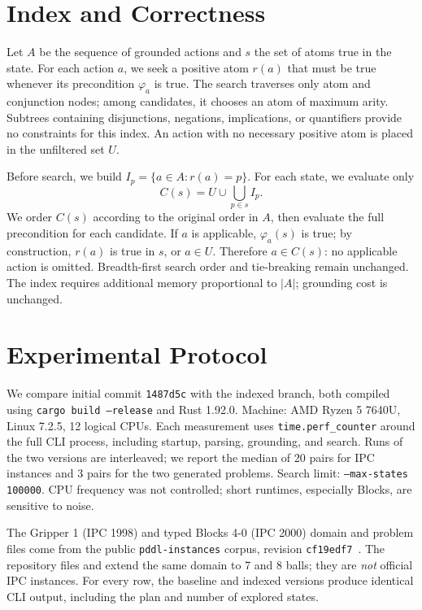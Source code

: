 \documentclass[10pt,a4paper]{article}
\begin{document}
\section{Index and Correctness}
Let $A$ be the sequence of grounded actions and $s$ the set of atoms
true in the state. For each action $a$, we seek a positive atom $r(a)$
that must be true whenever its precondition $\varphi_a$ is true. The
search traverses only atom and conjunction nodes; among candidates, it
chooses an atom of maximum arity. Subtrees containing disjunctions,
negations, implications, or quantifiers provide no constraints for this
index. An action with no necessary positive atom is placed in the
unfiltered set $U$.

Before search, we build $I_p=\{a\in A:r(a)=p\}$.
For each state, we evaluate only
\begin{equation}
 C(s)=U\cup\bigcup_{p\in s} I_p.
\end{equation}
We order $C(s)$ according to the original order in $A$, then evaluate
the full precondition for each candidate. If $a$ is applicable,
$\varphi_a(s)$ is true; by construction, $r(a)$ is true in $s$, or
$a\in U$. Therefore $a\in C(s)$: no applicable action is omitted.
Breadth-first search order and tie-breaking remain unchanged. The index
requires additional memory proportional to $|A|$; grounding cost is
unchanged.

\section{Experimental Protocol}
We compare initial commit \texttt{1487d5c} with the indexed branch,
both compiled using \texttt{cargo build --release} and Rust 1.92.0.
Machine: AMD Ryzen 5 7640U, Linux 7.2.5, 12 logical CPUs. Each measurement
uses \texttt{time.perf\_counter} around the full CLI process, including
startup, parsing, grounding, and search. Runs of the two versions are
interleaved; we report the median of 20 pairs for IPC instances and 3 pairs
for the two generated problems. Search limit: \texttt{--max-states 100000}.
CPU frequency was not controlled; short runtimes, especially Blocks, are
sensitive to noise.

The Gripper 1 (IPC 1998) and typed Blocks 4-0 (IPC 2000) domain and
problem files come from the public \texttt{pddl-instances} corpus,
revision \texttt{cf19edf7}~\cite{pddlinstances}. The repository files
 and 
extend the same domain to 7 and 8 balls; they are \emph{not} official IPC
instances. For every row, the baseline and indexed versions produce
identical CLI output, including the plan and number of explored states.
\end{document}
